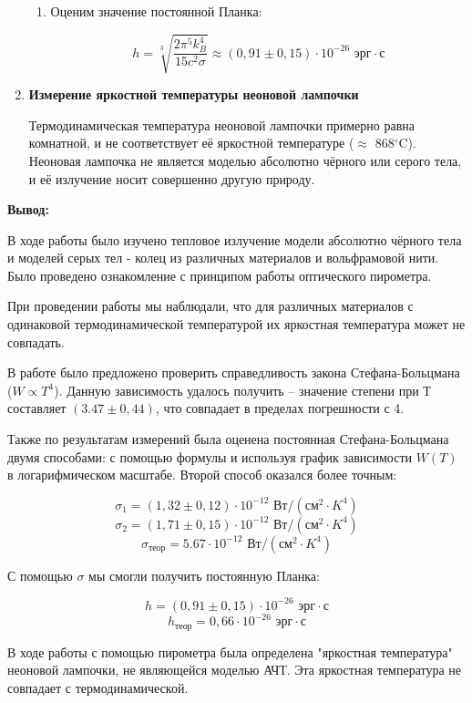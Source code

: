 \documentclass[a4paper, 12pt]{article}%
\begin{document}
\begin{enumerate}
\begin{enumerate}
\item Оценим значение постоянной Планка:

\begin{center}

\[h = \sqrt[3]{\frac{2 \pi^5 k_B^4}{15 c^2 \sigma}} \approx (0,91 \pm 0,15) \cdot 10^{-26} \text{ эрг} \cdot \text{с}\]
    
\end{center}

\end{enumerate}

\item \textbf{Измерение яркостной температуры неоновой лампочки}

Термодинамическая температура неоновой лампочки примерно равна комнатной, и не соответствует её яркостной температуре ($\approx$ 868$^{\circ}$C).  Неоновая лампочка не является моделью абсолютно чёрного или серого тела,  и её излучение носит совершенно другую природу. 

\end{enumerate}

\textbf{Вывод:}\\\par

В ходе работы было изучено тепловое излучение модели абсолютно чёрного тела и моделей серых тел - колец из различных материалов и вольфрамовой нити. Было проведено ознакомление с принципом работы оптического пирометра. \par

При проведении работы мы наблюдали, что для различных материалов с одинаковой термодинамической температурой их яркостная температура может не совпадать. \par

В работе было предложено проверить справедливость закона Стефана-Больцмана ($W \propto T^4$).  Данную зависимость удалось получить  -- значение степени при Т составляет $(3.47 \pm 0,44)$,  что совпадает в пределах погрешности с 4.\par

Также по результатам измерений была оценена постоянная Стефана-Больцмана двумя способами: с помощью формулы и используя график зависимости $W(T)$ в логарифмическом масштабе.  Второй способ оказался более точным:

\begin{center}

\[\sigma_1 = (1, 32 \pm 0,12) \cdot 10^{-12} \text{ Вт}/(\text{см}^2 \cdot K^4)\]
\[\sigma_2 = (1, 71 \pm 0,15) \cdot 10^{-12} \text{ Вт}/(\text{см}^2 \cdot K^4)\]
\[\sigma_\text{теор} = 5.67 \cdot 10^{-12} \text{ Вт}/(\text{см}^2 \cdot K^4)\]
     
\end{center}\par

С помощью $\sigma$ мы смогли получить постоянную Планка:

\[h =(0,91 \pm 0,15) \cdot 10^{-26} \text{ эрг} \cdot \text{с}\]
\[h_\text{теор} = 0,66 \cdot 10^{-26} \text{ эрг} \cdot \text{с}\]

В ходе работы с помощью пирометра была определена "яркостная температура" неоновой лампочки,  не являющейся моделью АЧТ.  Эта яркостная температура не совпадает с термодинамической.
\end{document}
